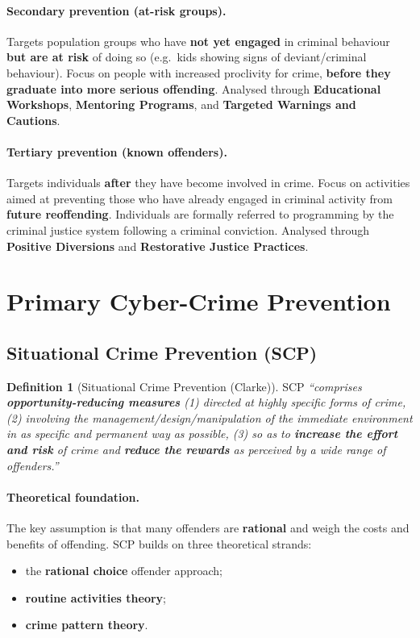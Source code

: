 \documentclass[11pt,a4paper,openany]{report}
\theoremstyle{definition}
\newtheorem{definition}{Definition}[chapter]
\theoremstyle{plain}
\theoremstyle{remark}
\begin{document}
\paragraph{Secondary prevention (at-risk groups).} Targets population groups who have \textbf{not yet engaged} in criminal behaviour \textbf{but are at risk} of doing so (e.g.\ kids showing signs of deviant/criminal behaviour). Focus on people with increased proclivity for crime, \textbf{before they graduate into more serious offending}. Analysed through \textbf{Educational Workshops}, \textbf{Mentoring Programs}, and \textbf{Targeted Warnings and Cautions}.

\paragraph{Tertiary prevention (known offenders).} Targets individuals \textbf{after} they have become involved in crime. Focus on activities aimed at preventing those who have already engaged in criminal activity from \textbf{future reoffending}. Individuals are formally referred to programming by the criminal justice system following a criminal conviction. Analysed through \textbf{Positive Diversions} and \textbf{Restorative Justice Practices}.

\section{Primary Cyber-Crime Prevention}

\subsection{Situational Crime Prevention (SCP)}

\begin{definition}[Situational Crime Prevention (Clarke)]
SCP \textit{``comprises \textbf{opportunity-reducing measures} (1) directed at highly specific forms of crime, (2) involving the management/design/manipulation of the immediate environment in as specific and permanent way as possible, (3) so as to \textbf{increase the effort and risk} of crime and \textbf{reduce the rewards} as perceived by a wide range of offenders.''}
\end{definition}

\paragraph{Theoretical foundation.} The key assumption is that many offenders are \textbf{rational} and weigh the costs and benefits of offending. SCP builds on three theoretical strands:
\begin{itemize}
    \item the \textbf{rational choice} offender approach;
    \item \textbf{routine activities theory};
    \item \textbf{crime pattern theory}.
\end{itemize}
\end{document}
